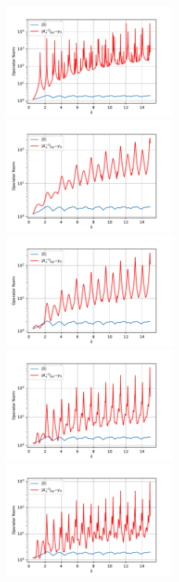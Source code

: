 \documentclass[12pt,journal,compsoc, onecolumn]{IEEEtran}
\begin{document}
\begin{figure}
    \includegraphics[width=0.5\textwidth]{simulation_scenario_8indexrange_-15.0-0.0_y_0_0.657269862562512.pdf}
    \includegraphics[width=0.5\textwidth]{simulation_scenario_9indexrange_-18.0-0.0_y_0_0.6496359740372837.pdf}  \\
    \includegraphics[width=0.5\textwidth]{simulation_scenario_1indexrange_-18.0-0.0_y_0_0.6300477177912973.pdf} 
    \includegraphics[width=0.5\textwidth]{simulation_scenario_7indexrange_-7.0-0.0_y_0_1.6318610980121495.pdf}  \\
     \includegraphics[width=0.5\textwidth]{simulation_scenario_6indexrange_-12.0-0.0_y_0_2.579539681123669.pdf} 

\end{figure}
\end{document}
